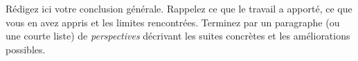 \chapter*{\conclusionname}
{}
\markboth{\conclusionname}{\conclusionname}
\thispagestyle{plain}

Rédigez ici votre conclusion générale. Rappelez ce que le travail a apporté,
ce que vous en avez appris et les limites rencontrées. Terminez par un
paragraphe (ou une courte liste) de \emph{perspectives} décrivant les
suites concrètes et les améliorations possibles.

\newpage
